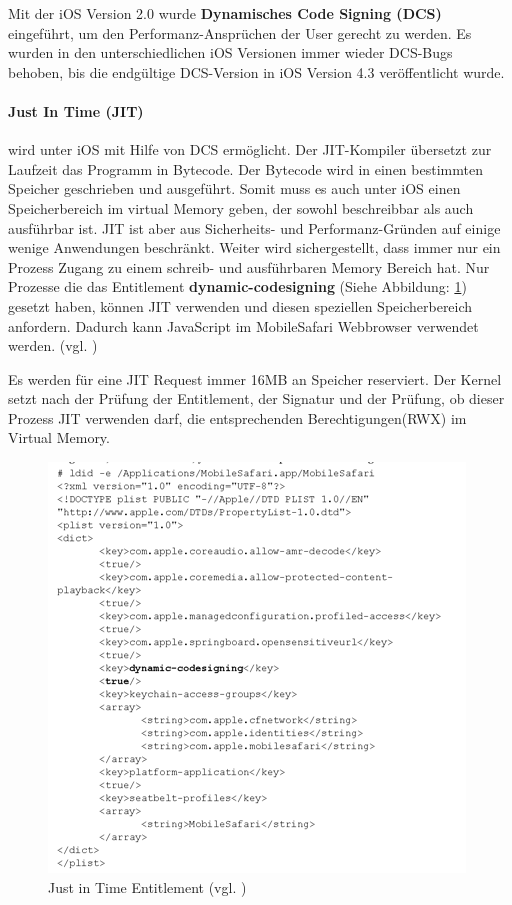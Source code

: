 Mit der iOS Version 2.0 wurde \textbf{Dynamisches Code Signing (DCS)} eingeführt, um den Performanz-Ansprüchen der User gerecht zu werden. Es wurden in den unterschiedlichen iOS Versionen immer wieder DCS-Bugs behoben, bis die endgültige DCS-Version in iOS Version 4.3 veröffentlicht wurde. 
\paragraph{Just In Time (JIT)} wird unter iOS mit Hilfe von DCS ermöglicht. Der JIT-Kompiler übersetzt zur Laufzeit das Programm in Bytecode. Der Bytecode wird in einen bestimmten Speicher geschrieben und ausgeführt. Somit muss es auch unter iOS einen Speicherbereich im virtual Memory geben, der sowohl beschreibbar als auch ausführbar ist.  JIT ist aber aus Sicherheits- und Performanz-Gründen auf einige wenige Anwendungen beschränkt. Weiter wird sichergestellt, dass immer nur ein Prozess Zugang zu einem schreib- und ausführbaren Memory Bereich hat. Nur Prozesse die das Entitlement \textbf{dynamic-codesigning} (Siehe Abbildung: \ref{fig:JIT}) gesetzt haben, können JIT verwenden und diesen speziellen Speicherbereich anfordern. Dadurch kann JavaScript im MobileSafari Webbrowser verwendet werden. (vgl. \cite{JIT[1]})

Es werden für eine JIT Request immer 16MB an Speicher reserviert. Der Kernel setzt nach der Prüfung der Entitlement, der Signatur und der Prüfung, ob dieser Prozess JIT verwenden darf, die entsprechenden Berechtigungen(RWX) im Virtual Memory.

\begin{figure}[htp!]
        \centering
                \includegraphics[scale=0.8]{JIT}
        \caption{Just in Time Entitlement (vgl. \cite{Hacking[1]}) }
        \label{fig:JIT}
\end{figure}
